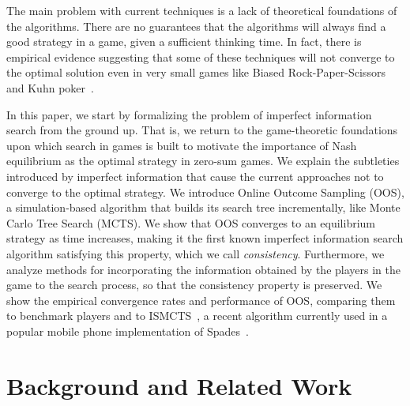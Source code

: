 \documentclass[letterpaper]{article}
\newcounter{vlNoteCounter}
\newcommand{\vlnote}[1]{{\scriptsize \color{blue} $\blacksquare$ \refstepcounter{vlNoteCounter}\textsf{[VL]$_{\arabic{vlNoteCounter}}$:{#1}}}}
\begin{document}

The main problem with current techniques is a lack of theoretical foundations of the algorithms. There are no guarantees that the algorithms will always find a good strategy in a game, given a sufficient thinking time. In fact, there is empirical evidence suggesting that some of these techniques will not converge to the optimal solution even in very small games like Biased Rock-Paper-Scissors and Kuhn poker~\cite{Shafiei09,Ponsen11Computing}.

In this paper, we start by formalizing the problem of imperfect information search from the ground up. That is, we return to the game-theoretic 
foundations upon which search in games is built to motivate the importance of Nash equilibrium as the optimal strategy in zero-sum games. We explain the subtleties introduced by imperfect information that cause the current approaches not to converge to the optimal strategy. We introduce Online Outcome Sampling (OOS), a simulation-based algorithm that builds its search tree incrementally, like Monte Carlo Tree Search (MCTS).  
We show that OOS converges to an equilibrium strategy as time increases, making it the first 
known imperfect information search algorithm satisfying this property, which we call {\it consistency}. Furthermore, we analyze methods for incorporating the information obtained by the players in the game to the search process, so that the consistency property is preserved. We show the empirical convergence rates and performance of OOS, comparing them to benchmark players and to ISMCTS~\cite{Cowling12ISMCTS}, a 
recent algorithm currently used in a popular mobile phone implementation of Spades~\cite{Whitehouse13Integrating}. 




\section{Background and Related Work}
\end{document}

